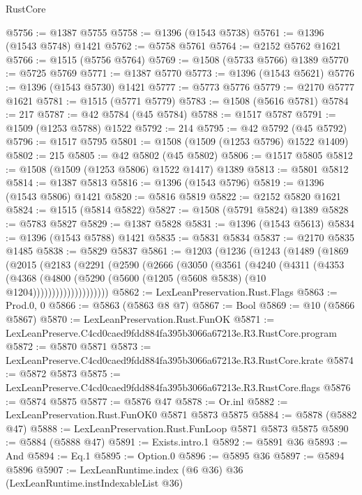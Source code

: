 \begin{lexlean}{RustCore}
\begin{coremodule}
@5756 := @1387 @5755
@5758 := @1396 (@1543 @5738)
@5761 := @1396 (@1543 @5748) @1421
@5762 := @5758 @5761
@5764 := @2152 @5762 @1621
@5766 := @1515 (@5756 @5764)
@5769 := @1508 (@5733 @5766) @1389
@5770 := @5725 @5769
@5771 := @1387 @5770
@5773 := @1396 (@1543 @5621)
@5776 := @1396 (@1543 @5730) @1421
@5777 := @5773 @5776
@5779 := @2170 @5777 @1621
@5781 := @1515 (@5771 @5779)
@5783 := @1508 (@5616 @5781)
@5784 := 217
@5787 := @42 @5784 (@45 @5784)
@5788 := @1517 @5787
@5791 := @1509 (@1253 @5788) @1522
@5792 := 214
@5795 := @42 @5792 (@45 @5792)
@5796 := @1517 @5795
@5801 := @1508 (@1509 (@1253 @5796) @1522 @1409)
@5802 := 215
@5805 := @42 @5802 (@45 @5802)
@5806 := @1517 @5805
@5812 := @1508 (@1509 (@1253 @5806) @1522 @1417) @1389
@5813 := @5801 @5812
@5814 := @1387 @5813
@5816 := @1396 (@1543 @5796)
@5819 := @1396 (@1543 @5806) @1421
@5820 := @5816 @5819
@5822 := @2152 @5820 @1621
@5824 := @1515 (@5814 @5822)
@5827 := @1508 (@5791 @5824) @1389
@5828 := @5783 @5827
@5829 := @1387 @5828
@5831 := @1396 (@1543 @5613)
@5834 := @1396 (@1543 @5788) @1421
@5835 := @5831 @5834
@5837 := @2170 @5835 @1485
@5838 := @5829 @5837
@5861 := @1203
    (@1236
      (@1243
        (@1489
          (@1869
            (@2015
              (@2183
                (@2291
                  (@2590
                    (@2666
                      (@3050
                        (@3561
                          (@4240
                            (@4311
                              (@4353
                                (@4368
                                  (@4800
                                    (@5290
                                      (@5600 (@1205 (@5608 @5838) (@10 @1204))))))))))))))))))))
@5862 := LexLeanPreservation.Rust.Flags
@5863 := Prod.{0, 0}
@5866 := @5863 (@5863 @8 @7)
@5867 := Bool
@5869 := @10 (@5866 @5867)
@5870 := LexLeanPreservation.Rust.FunOK
@5871 := LexLeanPreserve.C4cd0caed9fdd884fa395b3066a67213e.R3.RustCore.program
@5872 := @5870 @5871
@5873 := LexLeanPreserve.C4cd0caed9fdd884fa395b3066a67213e.R3.RustCore.krate
@5874 := @5872 @5873
@5875 := LexLeanPreserve.C4cd0caed9fdd884fa395b3066a67213e.R3.RustCore.flags
@5876 := @5874 @5875
@5877 := @5876 @47
@5878 := Or.inl
@5882 := LexLeanPreservation.Rust.FunOK0 @5871 @5873 @5875
@5884 := @5878 (@5882 @47)
@5888 := LexLeanPreservation.Rust.FunLoop @5871 @5873 @5875
@5890 := @5884 (@5888 @47)
@5891 := Exists.intro.{1}
@5892 := @5891 @36
@5893 := And
@5894 := Eq.{1}
@5895 := Option.{0}
@5896 := @5895 @36
@5897 := @5894 @5896
@5907 := LexLeanRuntime.index
    (@6 @36)
    @36
    (LexLeanRuntime.instIndexableList @36)

\end{coremodule}
\end{lexlean}
